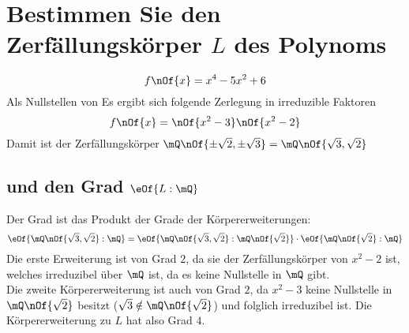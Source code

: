 \section{Bestimmen Sie den Zerfällungskörper $L$ des Polynoms}
\begin{equation}
	f\nOf{x} = x^4 - 5 x^2 + 6
\end{equation}
Als Nullstellen von
Es ergibt sich folgende Zerlegung in irreduzible Faktoren
\begin{equation}
	f\nOf{x} = \nOf{x^2-3}\nOf{x^2-2}
\end{equation}
Damit ist der Zerfällungskörper $\mQ\nOf{\pm\sqrt{2},\pm\sqrt{3}} = \mQ\nOf{\sqrt{3},\sqrt{2}}$ 

\subsection{und den Grad $\eOf{L:\mQ}$}
Der Grad ist das Produkt der Grade der Körpererweiterungen: 
\begin{equation}
	\eOf{\mQ\nOf{\sqrt3,\sqrt2}:\mQ} = \eOf{\mQ\nOf{\sqrt3,\sqrt2}:\mQ\nOf{\sqrt2}}\cdot\eOf{\mQ\nOf{\sqrt2}:\mQ}
\end{equation}
Die erste Erweiterung ist von Grad $2$, da sie der Zerfällungskörper von $x^2-2$ ist, welches irreduzibel über $\mQ$ ist, da es keine Nullstelle in $\mQ$ gibt. \\
Die zweite Körpererweiterung ist auch von Grad $2$, da $x^2-3$ keine Nullstelle in $\mQ\nOf{\sqrt2}$ besitzt ($\sqrt3\notin\mQ\nOf{\sqrt2}$) und folglich irreduzibel ist. Die Körpererweiterung zu $L$ hat also Grad $4$.